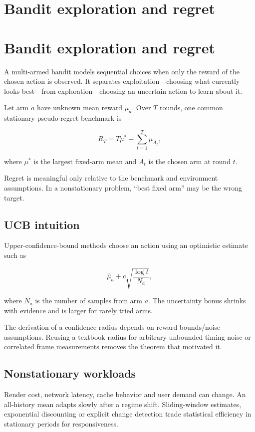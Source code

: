 \hypertarget{appendix-3dc863dbddf3}{}
\section*{Bandit exploration and regret}
\section{Bandit exploration and regret}\label{bandit-exploration-and-regret}

A multi-armed bandit models sequential choices when only the reward of the chosen action is observed. It separates exploitation---choosing what currently looks best---from exploration---choosing an uncertain action to learn about it.

Let arm \(a\) have unknown mean reward \(\mu_a\). Over \(T\) rounds, one common stationary pseudo-regret benchmark is

\[
R_T=T\mu^*-\sum_{t=1}^{T}\mu_{A_t},
\]

where \(\mu^*\) is the largest fixed-arm mean and \(A_t\) is the chosen arm at round \(t\).

Regret is meaningful only relative to the benchmark and environment assumptions. In a nonstationary problem, ``best fixed arm'' may be the wrong target.

\subsection{UCB intuition}\label{ucb-intuition}

Upper-confidence-bound methods choose an action using an optimistic estimate such as

\[
\hat\mu_a+
c\sqrt{\frac{\log t}{N_a}},
\]

where \(N_a\) is the number of samples from arm \(a\). The uncertainty bonus shrinks with evidence and is larger for rarely tried arms.

The derivation of a confidence radius depends on reward bounds/noise assumptions. Reusing a textbook radius for arbitrary unbounded timing noise or correlated frame measurements removes the theorem that motivated it.

\subsection{Nonstationary workloads}\label{nonstationary-workloads}

Render cost, network latency, cache behavior and user demand can change. An all-history mean adapts slowly after a regime shift. Sliding-window estimates, exponential discounting or explicit change detection trade statistical efficiency in stationary periods for responsiveness.

